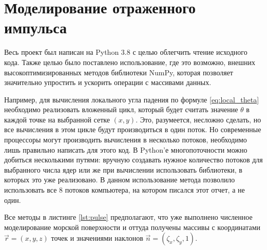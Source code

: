 \appendix
\newpage
\section{Моделирование отраженного импульса}%
\label{app:sec:pulse}
Весь проект был написан на Python 3.8 с целью облегчить чтение исходного кода.
Также целью было поставлено использование, где это возможно, внешних
высокоптимизированных методов библиотеки NumPy, которая позволяет значительно
упростить и ускорить операции с массивами данных.

Например, для вычисления локального угла падения по формуле
\eqref{eq:local_theta} необходимо реализовать вложенный цикл, который будет
считать значение $\theta$ в каждой точке на выбранной сетке  $(x,y)$. Это,
разумеется, несложно сделать, но все вычисления в этом цикле будут
производиться в один поток. Но современные процессоры могут производить
вычисления в несколько потоков, необходимо лишь правильно написать для этого
код. В Python'е многопоточности можно добиться несколькими путями: вручную
создавать нужное количество потоков для выбранного числа ядер или же
при вычислении использовать библиотеки, в которых это уже реализовано. 
В данном использование метода
 позволило использовать
все 8 потоков компьютера, на котором писался этот отчет, а не один.

Все методы в листинге \ref{lst:pulse} предполагают, что уже выполнено
численное моделирование морской поверхности и оттуда получены массивы с
координатами $\vec r = (x,y,z)$ точек и значениями наклонов $\vec n =
(\zeta_x,\zeta_y,1)$.





